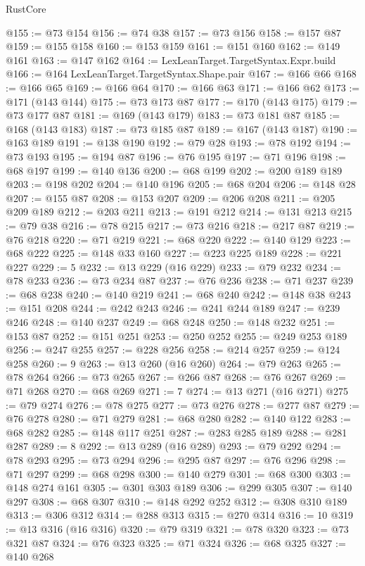 \begin{lexlean}{RustCore}
\begin{coremodule}
@155 := @73 @154
@156 := @74 @38
@157 := @73 @156
@158 := @157 @87
@159 := @155 @158
@160 := @153 @159
@161 := @151 @160
@162 := @149 @161
@163 := @147 @162
@164 := LexLeanTarget.TargetSyntax.Expr.build
@166 := @164 LexLeanTarget.TargetSyntax.Shape.pair
@167 := @166 @66
@168 := @166 @65
@169 := @166 @64
@170 := @166 @63
@171 := @166 @62
@173 := @171 (@143 @144)
@175 := @73 @173 @87
@177 := @170 (@143 @175)
@179 := @73 @177 @87
@181 := @169 (@143 @179)
@183 := @73 @181 @87
@185 := @168 (@143 @183)
@187 := @73 @185 @87
@189 := @167 (@143 @187)
@190 := @163 @189
@191 := @138 @190
@192 := @79 @28
@193 := @78 @192
@194 := @73 @193
@195 := @194 @87
@196 := @76 @195
@197 := @71 @196
@198 := @68 @197
@199 := @140 @136
@200 := @68 @199
@202 := @200 @189 @189
@203 := @198 @202
@204 := @140 @196
@205 := @68 @204
@206 := @148 @28
@207 := @155 @87
@208 := @153 @207
@209 := @206 @208
@211 := @205 @209 @189
@212 := @203 @211
@213 := @191 @212
@214 := @131 @213
@215 := @79 @38
@216 := @78 @215
@217 := @73 @216
@218 := @217 @87
@219 := @76 @218
@220 := @71 @219
@221 := @68 @220
@222 := @140 @129
@223 := @68 @222
@225 := @148 @33 @160
@227 := @223 @225 @189
@228 := @221 @227
@229 := 5
@232 := @13 @229 (@16 @229)
@233 := @79 @232
@234 := @78 @233
@236 := @73 @234 @87
@237 := @76 @236
@238 := @71 @237
@239 := @68 @238
@240 := @140 @219
@241 := @68 @240
@242 := @148 @38
@243 := @151 @208
@244 := @242 @243
@246 := @241 @244 @189
@247 := @239 @246
@248 := @140 @237
@249 := @68 @248
@250 := @148 @232
@251 := @153 @87
@252 := @151 @251
@253 := @250 @252
@255 := @249 @253 @189
@256 := @247 @255
@257 := @228 @256
@258 := @214 @257
@259 := @124 @258
@260 := 9
@263 := @13 @260 (@16 @260)
@264 := @79 @263
@265 := @78 @264
@266 := @73 @265
@267 := @266 @87
@268 := @76 @267
@269 := @71 @268
@270 := @68 @269
@271 := 7
@274 := @13 @271 (@16 @271)
@275 := @79 @274
@276 := @78 @275
@277 := @73 @276
@278 := @277 @87
@279 := @76 @278
@280 := @71 @279
@281 := @68 @280
@282 := @140 @122
@283 := @68 @282
@285 := @148 @117 @251
@287 := @283 @285 @189
@288 := @281 @287
@289 := 8
@292 := @13 @289 (@16 @289)
@293 := @79 @292
@294 := @78 @293
@295 := @73 @294
@296 := @295 @87
@297 := @76 @296
@298 := @71 @297
@299 := @68 @298
@300 := @140 @279
@301 := @68 @300
@303 := @148 @274 @161
@305 := @301 @303 @189
@306 := @299 @305
@307 := @140 @297
@308 := @68 @307
@310 := @148 @292 @252
@312 := @308 @310 @189
@313 := @306 @312
@314 := @288 @313
@315 := @270 @314
@316 := 10
@319 := @13 @316 (@16 @316)
@320 := @79 @319
@321 := @78 @320
@323 := @73 @321 @87
@324 := @76 @323
@325 := @71 @324
@326 := @68 @325
@327 := @140 @268

\end{coremodule}
\end{lexlean}
